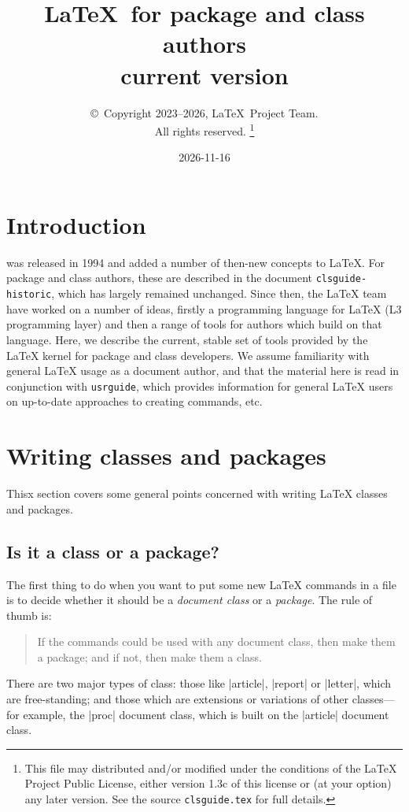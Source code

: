 \documentclass{ltxguide}
\title{\LaTeX\ for package and class authors\\current version}
\author{\copyright~Copyright 2023--2026, \LaTeX\ Project Team.\\
   All rights reserved.%
   \footnote{This file may distributed and/or modified under the
     conditions of the \LaTeX{} Project Public License, either version 1.3c
     of this license or (at your option) any later version. See the source
    \texttt{clsguide.tex} for full details.}%
}
\date{2026-11-16}
\begin{document}
\maketitle

\tableofcontents

\section{Introduction}

\LaTeXe{} was released in 1994 and added a number of then-new concepts to
\LaTeX{}. For package and class authors, these are described in the document
\texttt{clsguide-historic}, which has largely remained unchanged. Since then,
the \LaTeX{} team have worked on a number of ideas, firstly a programming
language for \LaTeX{} (L3 programming layer) and then a range of tools for
authors which build on that language. Here, we describe the current, stable set
of tools provided by the \LaTeX{} kernel for package and class developers. We
assume familiarity with general \LaTeX{} usage as a document author, and that
the material here is read in conjunction with \texttt{usrguide}, which provides
information for general \LaTeX{} users on up-to-date approaches to creating
commands, etc.

\section{Writing classes and packages}
\label{sec:writing}

Thisx section covers some general points concerned with writing
\LaTeX{} classes and packages.

\subsection{Is it a class or a package?}
\label{sec:classorpkg}

The first thing to do when you want to put some new \LaTeX{} commands
in a file is to decide whether it should be a \emph{document class} or a
\emph{package}.  The rule of thumb is:
\begin{quote}
  If the commands could be used with any document class, then make
  them a package; and if not, then make them a class.
\end{quote}

There are two major types of class: those like |article|, |report| or
|letter|, which are free-standing; and those which are extensions or
variations of other classes---for example, the |proc| document class,
which is built on the |article| document class.
\end{document}
